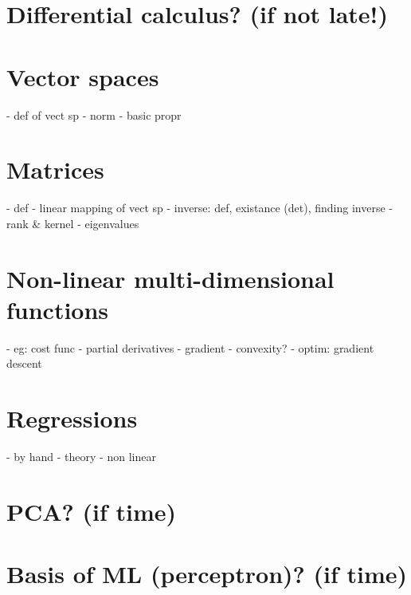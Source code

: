 \documentclass[11pt,a4paper]{article}
\begin{document}
\section{Differential calculus? (if not late!)}

\section{Vector spaces}
- def of vect sp
- norm
- basic propr
\section{Matrices}
- def
- linear mapping of vect sp
- inverse: def, existance (det), finding inverse
- rank \& kernel
- eigenvalues

\section{Non-linear multi-dimensional functions}
- eg: cost func
- partial derivatives
- gradient
- convexity?
- optim: gradient descent
\section{Regressions}
- by hand
- theory
- non linear

\section{PCA? (if time)}
\section{Basis of ML (perceptron)? (if time)}
\end{document}

